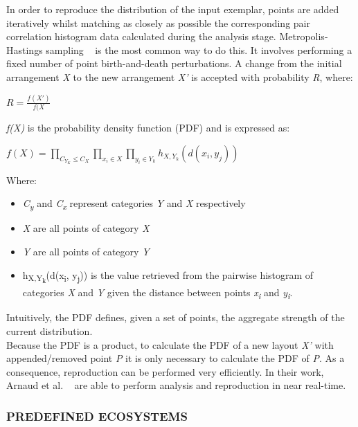 In order to reproduce the distribution of the input exemplar, points are added iteratively whilst matching as closely as possible the corresponding pair correlation histogram data calculated during the analysis stage. Metropolis-Hastings sampling ~\cite{Hurtut2009} is the most common way to do this. It involves performing a fixed number of point birth-and-death perturbations. A change from the initial arrangement \textit{X} to the new arrangement \textit{X'} is accepted with probability \textit{R}, where:

\begin{center}
$ R = \frac{f(X')}{f(X}$
\end{center}
\textit{f(X)} is the probability density function (PDF) and is expressed as:\\

\begin{center}
$ f(X) = \prod_{C_{Y_{K}} \leq C_{X}} 
		 \prod_{x_{i} \in X}
		 \prod_{y_{i} \in Y_{k}} 
		 h_{X,Y_{k}}(d(x_{i},y_{j}))$
\end{center} 

Where:
\begin{itemize}
\item \textit{C\textsubscript{y}} and \textit{C\textsubscript{x}} represent categories \textit{Y} and \textit{X} respectively
\item \textit{X} are all points of category \textit{X}
\item \textit{Y} are all points of category \textit{Y}
\item h\textsubscript{X,Y\textsubscript{k}}(d(x\textsubscript{i}, y\textsubscript{j})) is the value retrieved from the pairwise histogram of categories \textit{X} and \textit{Y} given the distance between points \textit{x\textsubscript{i}} and \textit{y\textsubscript{i}}.
\end{itemize}
Intuitively, the PDF defines, given a set of points, the aggregate strength of the current distribution.\\

Because the PDF is a product, to calculate the PDF of a new layout \textit{X'} with appended/removed point \textit{P} it is only necessary to calculate the PDF of \textit{P}. As a consequence, reproduction can be performed very efficiently. In their work, Arnaud et al. ~\cite{Emilien} are able to perform analysis and reproduction in near real-time.\\

\subsubsection{PREDEFINED ECOSYSTEMS}

